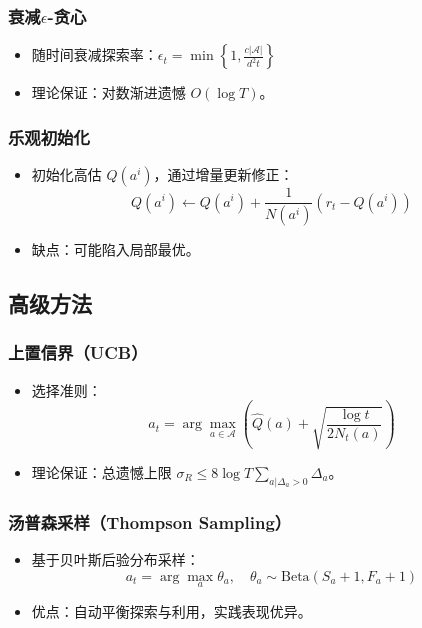\subsubsection{衰减\(\epsilon\)-贪心}
\begin{itemize}
    \item 随时间衰减探索率：\( \epsilon_t = \min\left\{1, \frac{c|\mathcal{A}|}{d^2 t}\right\} \)
    \item 理论保证：对数渐进遗憾 \( O(\log T) \)。
\end{itemize}

\subsubsection{乐观初始化}
\begin{itemize}
    \item 初始化高估 \( Q(a^i) \)，通过增量更新修正：
        \[
        Q(a^i) \leftarrow Q(a^i) + \frac{1}{N(a^i)} (r_t - Q(a^i))
        \]
    \item 缺点：可能陷入局部最优。
\end{itemize}

\subsection{高级方法}
\subsubsection{上置信界（UCB）}
\begin{itemize}
    \item 选择准则：
        \[
        a_t = \arg\max_{a \in \mathcal{A}} \left( \hat{Q}(a) + \sqrt{\frac{\log t}{2 N_t(a)}} \right)
        \]
    \item 理论保证：总遗憾上限 \( \sigma_R \leq 8 \log T \sum_{a|\Delta_a > 0} \Delta_a \)。
\end{itemize}

\subsubsection{汤普森采样（Thompson Sampling）}
\begin{itemize}
    \item 基于贝叶斯后验分布采样：
        \[
        a_t = \arg\max_{a} \theta_a, \quad \theta_a \sim \text{Beta}(S_a + 1, F_a + 1)
        \]
    \item 优点：自动平衡探索与利用，实践表现优异。
\end{itemize}

